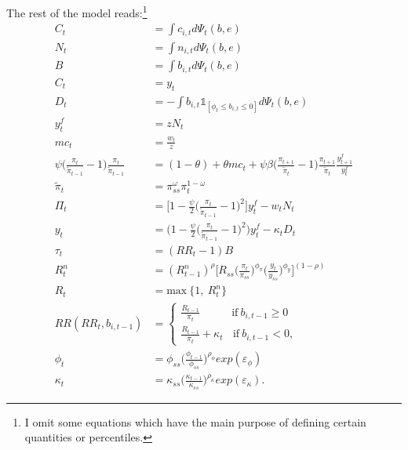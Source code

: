 \documentclass[a4paper,12pt]{article} %
\numberwithin{equation}{section} %
\numberwithin{figure}{section}
\numberwithin{table}{section}
\begin{document}
\begin{refsection}
\begin{appendices}
The rest of the model reads:\footnote{I omit some equations which have the main purpose of defining certain quantities or percentiles.}
\begin{align}
    C_t &= \int c_{i,t} d \Psi_t (b,e) \\
    N_t &= \int n_{i,t} d \Psi_t (b,e) \\ 
    B &= \int b_{i,t} d \Psi_t (b,e) \\
    C_t &= y_t \\
    D_t &= - \int b_{i,t} \mathbb{1}_{[\phi_t \le b_{i,t} \le 0]} d \Psi_t (b,e) \\
    y_t^f &= zN_t \\
    mc_t &= \frac{w_t}{z} \\
    \psi \Bigg( \frac{\pi_t}{\tilde{\pi}_{t-1}} - 1 \Bigg) \frac{\pi_t}{\tilde{\pi}_{t-1}} &= (1-\theta) + \theta mc_t + \psi \beta \Bigg( \frac{\pi_{t+1}}{\tilde{\pi}_{t}} - 1 \Bigg) \frac{\pi_{t+1}}{\tilde{\pi}_{t}} \frac{y_{t+1}^f}{y_t^f} \\
    \tilde{\pi}_t &= \pi_{ss}^{\omega} \pi_{t}^{1-\omega} \\
    \Pi_t &= \Bigg[ 1 - \frac{\psi}{2} \Bigg( \frac{\pi_t}{\tilde{\pi}_{t-1}} - 1 \Bigg)^2 \Bigg] y_t^f - w_t N_t \\
    y_t &= \Bigg( 1 - \frac{\psi}{2} \Bigg( \frac{\pi_t}{\tilde{\pi}_{t-1}} - 1 \Bigg)^2 \Bigg) y_t^f - \kappa_t D_t \\
    \tau_t &= (RR_t - 1) B \\
    R_{t}^n &= ( R_{t-1}^n )^{\rho} \Bigg[ R_{ss} \Bigg( \frac{\pi_t}{\pi_{ss}} \Bigg)^{\phi_{\pi}} \Bigg( \frac{y_t}{y_{ss}} \Bigg)^{\phi_y} \Bigg]^{(1-\rho)} \\
    R_t &= \text{max} \ \{ 1, \ R_{t}^n \} \\
    RR (RR_t, b_{i,t-1}) &= \begin{cases}
	\frac{R_{t-1}}{\pi_t} \ \ \ \ \ \ \ \ \ \ \ \ \ \text{if} \ b_{i,t-1} \ge 0 \\
	\frac{R_{t-1}}{\pi_t} + \kappa_t \ \ \ \ \text{if} \ b_{i,t-1} < 0,
	\end{cases} \\
    \phi_t &= \phi_{ss} \Bigg( \frac{\phi_{t-1}}{\phi_{ss}} \Bigg)^{\rho_{\phi}} exp(\varepsilon_{\phi}) \\
    \kappa_t &= \kappa_{ss} \Bigg( \frac{\kappa_{t-1}}{\kappa_{ss}} \Bigg)^{\rho_{\kappa}} exp(\varepsilon_{\kappa}).
\end{align}


\end{appendices}
\end{refsection}
\end{document}
